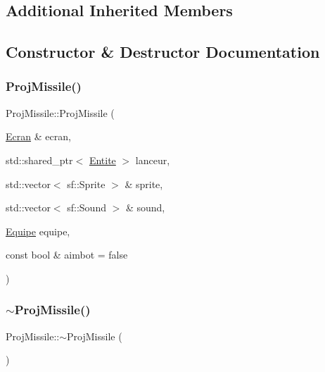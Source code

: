 \subsection*{Additional Inherited Members}


\subsection{Constructor \& Destructor Documentation}
\mbox{\label{class_proj_missile_aa7eb20457df3b5c051cd607c9f92ae67}} 
\subsubsection{\texorpdfstring{Proj\+Missile()}{ProjMissile()}}
{\footnotesize\ttfamily Proj\+Missile\+::\+Proj\+Missile (\begin{DoxyParamCaption}\item[{\mbox{\hyperlink{class_ecran}{Ecran}} \&}]{ecran,  }\item[{std\+::shared\+\_\+ptr$<$ \mbox{\hyperlink{class_entite}{Entite}} $>$}]{lanceur,  }\item[{std\+::vector$<$ sf\+::\+Sprite $>$ \&}]{sprite,  }\item[{std\+::vector$<$ sf\+::\+Sound $>$ \&}]{sound,  }\item[{\mbox{\hyperlink{constantes_8h_a08fa5554288d5031a8f3bb83cc04ee83}{Equipe}}}]{equipe,  }\item[{const bool \&}]{aimbot = {\ttfamily false} }\end{DoxyParamCaption})}

\mbox{\label{class_proj_missile_adf1e62cc1a0c195b6de72ca7830338c5}} 
\subsubsection{\texorpdfstring{$\sim$\+Proj\+Missile()}{~ProjMissile()}}
{\footnotesize\ttfamily Proj\+Missile\+::$\sim$\+Proj\+Missile (\begin{DoxyParamCaption}{ }\end{DoxyParamCaption})\hspace{0.3cm}{\ttfamily [inline]}}



